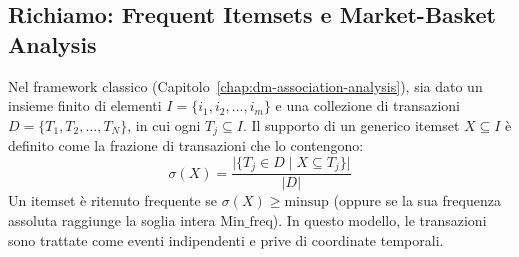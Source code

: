 \subsection{Richiamo: Frequent Itemsets e Market-Basket Analysis}
Nel framework classico (Capitolo~\ref{chap:dm-association-analysis}), sia dato un insieme finito di elementi $I = \{i_1, i_2, \dots, i_m\}$ e una collezione di transazioni $D = \{T_1, T_2, \dots, T_N\}$, in cui ogni $T_j \subseteq I$. Il supporto di un generico itemset $X \subseteq I$ è definito come la frazione di transazioni che lo contengono:
\begin{equation}
\label{eq:seq-recall-support}
\sigma(X) = \frac{\big| \{ T_j \in D \mid X \subseteq T_j \} \big|}{|D|}
\end{equation}
Un itemset è ritenuto frequente se $\sigma(X) \ge \text{minsup}$ (oppure se la sua frequenza assoluta raggiunge la soglia intera $\text{Min\_freq}$). In questo modello, le transazioni sono trattate come eventi indipendenti e prive di coordinate temporali.

